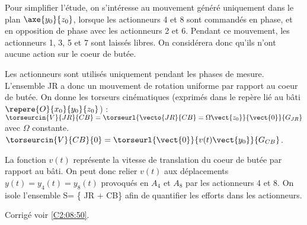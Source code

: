 Pour simplifier l’étude, on s’intéresse au mouvement généré uniquement dans le plan 
$\axe{y_0}{z_0}$, lorsque les actionneurs 4 et 8 sont commandés en phase, et en opposition de
phase avec les actionneurs 2 et 6. Pendant ce mouvement, les actionneurs 1, 3, 5 et 7 sont
laissés libres. On considérera donc qu’ils n’ont aucune action sur le coeur de butée.

\fi


\ifprof
\else
\fi

\ifprof
\else

Les actionneurs sont utilisés uniquement pendant les phases de mesure. L’ensemble JR a
donc un mouvement de rotation uniforme par rapport au coeur de butée. On donne les
torseurs cinématiques (exprimés dans le repère lié au bâti $\repere{O}{x_0}{y_0}{z_0}$) : 
$\torseurcin{V}{JR}{CB} =\torseurl{\vecto{JR}{CB}=\Omega\vect{z_0}}{\vect{0}}{G_{JR}}$ avec $\Omega$ constante.
$\torseurcin{V}{CB}{0} =\torseurl{\vect{0}}{v(t)\vect{y_0}}{G_{CB}}$.

La fonction $v(t)$ représente la vitesse de translation du coeur de butée par rapport au bâti.
On peut donc relier $v(t)$ aux déplacements $y(t) = y_4(t) = y_8(t)$ provoqués en $A_4$ et $A_8$
par les actionneurs 4 et 8.
On isole l’ensemble S= \{ JR + CB\} afin de quantifier les efforts dans les actionneurs.
\fi

\ifprof
\else
\fi

\ifprof
\else
\fi

\ifprof
\else
\fi

\ifprof
\else
\fi



\ifprof
\else
\begin{flushright}
\footnotesize{Corrigé voir \ref{C2:08:50}.}
\end{flushright}%
\fi